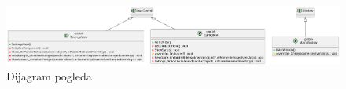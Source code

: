 \documentclass[12pt,a4paper]{report}
\begin{document}
\begin{landscape}
\begin{figure}[p]
\centering
\vfill
\includegraphics[width=\textwidth,height=\textheight,keepaspectratio]{../PlantUML/Views/include.png}
\caption{Dijagram pogleda}
\vfill
\end{figure}
\newpage

\end{landscape}
\end{document}

